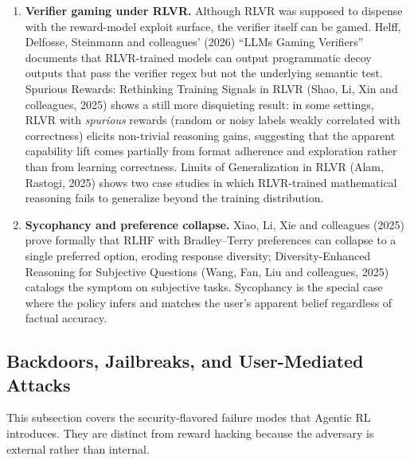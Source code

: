 \begin{enumerate}
\def\labelenumi{(\roman{enumi})}
\setcounter{enumi}{1}
\item
  \textbf{Verifier gaming under RLVR.} Although RLVR was supposed to dispense with the reward-model exploit surface, the verifier itself can be gamed. Helff, Delfosse, Steinmann and colleagues' (2026) ``LLMs Gaming Verifiers'' documents that RLVR-trained models can output programmatic decoy outputs that pass the verifier regex but not the underlying semantic test. Spurious Rewards: Rethinking Training Signals in RLVR (Shao, Li, Xin and colleagues, 2025) shows a still more disquieting result: in some settings, RLVR with \emph{spurious} rewards (random or noisy labels weakly correlated with correctness) elicits non-trivial reasoning gains, suggesting that the apparent capability lift comes partially from format adherence and exploration rather than from learning correctness. Limits of Generalization in RLVR (Alam, Rastogi, 2025) shows two case studies in which RLVR-trained mathematical reasoning fails to generalize beyond the training distribution.
\item
  \textbf{Sycophancy and preference collapse.} Xiao, Li, Xie and colleagues (2025) prove formally that RLHF with Bradley--Terry preferences can collapse to a single preferred option, eroding response diversity; Diversity-Enhanced Reasoning for Subjective Questions (Wang, Fan, Liu and colleagues, 2025) catalogs the symptom on subjective tasks. Sycophancy is the special case where the policy infers and matches the user's apparent belief regardless of factual accuracy.
\end{enumerate}

\subsection{Backdoors, Jailbreaks, and User-Mediated Attacks}\label{backdoors-jailbreaks-and-user-mediated-attacks}

This subsection covers the security-flavored failure modes that Agentic RL introduces. They are distinct from reward hacking because the adversary is external rather than internal.


